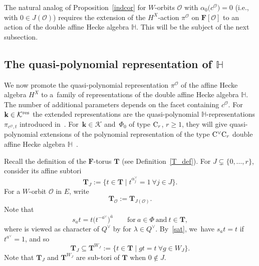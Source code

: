 \documentclass[pdftex]{sigma}
\numberwithin{equation}{section}
\begin{document}
The natural analog of Proposition~\ref{indcor} for $W$-orbits $\mathcal{O}$ with $\alpha_0\bigl(c^\mathcal{O}\bigr)=0$ (i.e., with $0\in J(\mathcal{O})$) requires the extension of the $H^X$-action $\pi^\mathcal{O}$ on $\mathbf{F}[\mathcal{O}]$ to an action of the double affine Hecke algebra $\mathbb{H}$. This will be the subject of the next subsection.

\subsection[The quasi-polynomial representation of H]{The quasi-polynomial representation of $\boldsymbol{\mathbb{H}}$}\label{wtsection}
We now promote the quasi-polynomial representation $\pi^\mathcal{O}$ of the affine Hecke algebra $H^X$ to a~family of representations of the double affine Hecke algebra $\mathbb{H}$.
The number of additional parameters
depends on the facet  containing $c^\mathcal{O}$.
For $\mathbf{k}\in\mathcal{K}^{{\rm res}}$ the extended representations are the quasi-polynomial $\mathbb{H}$-representations $\pi_{c^\mathcal{O},t}$ introduced in~\cite[Theorem~1.1]{SSV2}. For~${\mathbf{k}\in\mathcal{K}}$ and~$\Phi_0$ of type ${\rm C}_r$, $r\geq 1$, they will give quasi-polynomial extensions of the polynomial representation of the
type ${\rm C}^\vee{\rm C}_r$ double affine Hecke algebra $\mathbb{H}$~\cite{No,Sa}.

Recall the definition of the $\mathbf{F}$-torus $\mathbf{T}$ (see Definition~\ref{T_def}). For $J\subsetneq\{0,\dots,r\}$, consider its affine subtori
\begin{equation*}
\mathbf{T}_J:=\bigl\{t\in\mathbf{T}\mid t^{\alpha_j^\vee}=1\ \forall j\in J\bigr\}.
\end{equation*}
For a $W$-orbit $\mathcal{O}$ in $E$, write
\[\mathbf{T}_\mathcal{O}:=\mathbf{T}_{J(\mathcal{O})}.
\]
Note that
\begin{equation}\label{sat}
s_at=t\bigl(t^{-a^\vee}\bigr)^{\overline{a}}\qquad \text{for}\ a\in\Phi\ \text{and}\ t\in\mathbf{T},
\end{equation}
where  is viewed as character of $Q^\vee$ by  for
$\lambda\in Q^\vee$. By~\eqref{sat}, we~have
$s_at=t$ if $t^{a^\vee}=1$, and so
\begin{equation}\label{containedinv}
\mathbf{T}_J\subseteq\mathbf{T}^{W_J}:=\{t\in\mathbf{T} \mid gt=t\ \forall g\in W_J\}.
\end{equation}
Note that $\mathbf{T}_J$ and $\mathbf{T}^{W_J}$ are sub-tori of $\mathbf{T}$ when $0\not\in J$.
\end{document}
